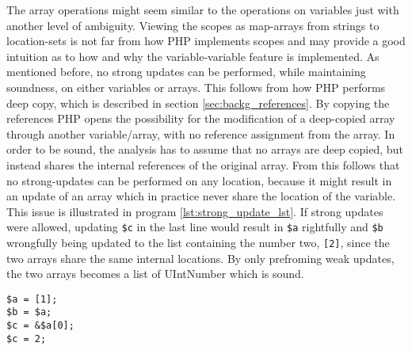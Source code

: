 The array operations might seem similar to the operations on variables just with another level of ambiguity. Viewing the scopes as map-arrays from strings to location-sets is not far from how PHP implements scopes and may provide a good intuition as to how and why the variable-variable feature is implemented. As mentioned before, no strong updates can be performed, while maintaining soundness, on either variables or arrays. This follows from how PHP performs deep copy, which is described in section \ref{sec:backg_references}. By copying the references PHP opens the possibility for the modification of a deep-copied array through another variable/array, with no reference assignment from the array.  In order to be sound, the analysis has to assume that no arrays are deep copied, but instead shares the internal references of the original array. From this follows that no strong-updates can be performed on any location, because it might result in an update of an array which in practice never share the location of the variable. This issue is illustrated in program \ref{lst:strong_update_lst}. If strong updates were allowed, updating \texttt{\$c} in the last line would result in \texttt{\$a} rightfully and \texttt{\$b} wrongfully being updated to the list containing the number two, \texttt{[2]}, since the two arrays share the same internal locations. By only prefroming weak updates, the two arrays becomes a list of { UIntNumber} which is sound.
\begin{program}
\centering
\begin{lstlisting}
$a = [1];
$b = $a;
$c = &$a[0];
$c = 2;
\end{lstlisting}
\caption{  }
\label{lst:strong_update_lst}
\end{program}
